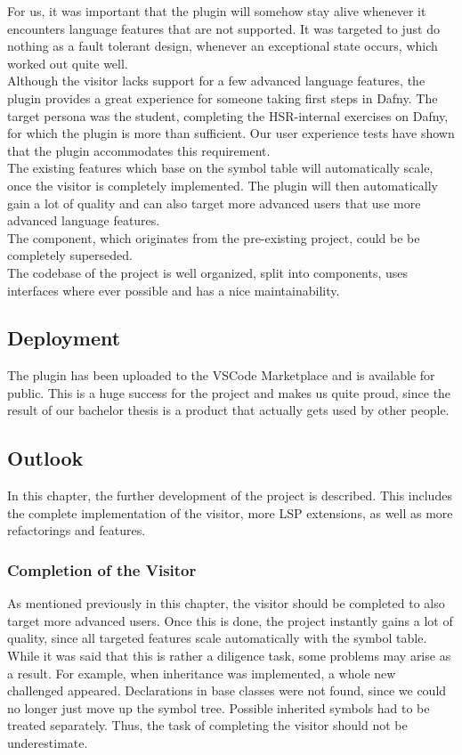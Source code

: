 For us, it was important that the plugin will somehow stay alive whenever it encounters language features that are not supported.
It was targeted to just do nothing as a fault tolerant design, whenever an exceptional state occurs, which worked out quite well.\\

Although the visitor lacks support for a few advanced language features, the plugin provides a great experience for someone taking first steps in Dafny.
The target persona was the student, completing the HSR-internal exercises on Dafny, for which the plugin is more than sufficient.
Our user experience tests have shown that the plugin accommodates this requirement.\\

The existing features which base on the symbol table will automatically scale, once the visitor is completely implemented.
The plugin will then automatically gain a lot of quality and can also target more advanced users that use more advanced language features.\\

The  component, which originates from the pre-existing project, could be be completely superseded.\\

The codebase of the project is well organized, split into components, uses interfaces where ever possible and has a nice maintainability.

\subsection{Deployment}
The plugin has been uploaded to the VSCode Marketplace and is available for public.
This is a huge success for the project and makes us quite proud, since the result of our
bachelor thesis is a product that actually gets used by other people.

\subsection{Outlook}
In this chapter, the further development of the project is described.
This includes the complete implementation of the visitor, more LSP extensions, as well as more refactorings and features.

\subsubsection{Completion of the Visitor}
As mentioned previously in this chapter, the visitor should be completed to also target more advanced users.
Once this is done, the project instantly gains a lot of quality, since all targeted features scale automatically with the symbol table.
While it was said that this is rather a diligence task, some problems may arise as a result.
For example, when inheritance was implemented, a whole new challenged appeared.
Declarations in base classes were not found, since we could no longer just move up the symbol tree.
Possible inherited symbols had to be treated separately.
Thus, the task of completing the visitor should not be underestimate.

